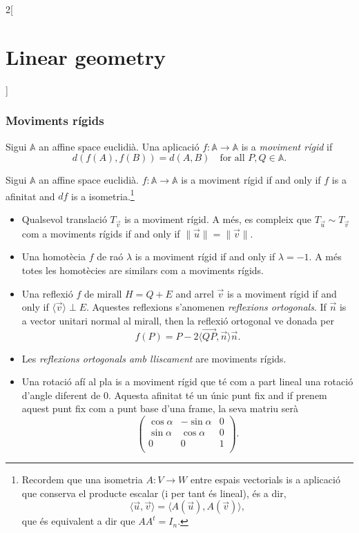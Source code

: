 \documentclass[class=article,10pt,crop=false]{standalone}
\begin{document}
\begin{multicols}{2}[\section{Linear geometry}]
\subsubsection{Moviments rígids}
\begin{definition}
Sigui $\mathbb{A}$ an affine space euclidià. Una aplicació $f:\mathbb{A}\rightarrow\mathbb{A}$ is a \textit{moviment rígid} if $$d(f(A),f(B))=d(A,B)\quad\text{for all } P,Q\in\mathbb{A}.$$
\end{definition}
\begin{prop}
Sigui $\mathbb{A}$ an affine space euclidià. $f:\mathbb{A}\rightarrow\mathbb{A}$ is a moviment rígid if and only if $f$ is a afinitat and $df$ is a isometria.\footnote{Recordem que una isometria $A:V\rightarrow W$ entre espais vectorials is a aplicació que conserva el producte escalar (i per tant és lineal), és a dir, $$\langle\overrightarrow{u},\overrightarrow{v}\rangle=\langle A(\overrightarrow{u}),A(\overrightarrow{v})\rangle,$$ que és equivalent a dir que $AA^t=I_n$.}
\end{prop}
\begin{prop}
\hfill
\begin{itemize}
    \item Qualsevol translació $T_{\overrightarrow{v}}$ is a moviment rígid. A més, es compleix que $T_{\overrightarrow{u}}\sim T_{\overrightarrow{v}}$ com a moviments rígids if and only if $\|\overrightarrow{u}\|=\|\overrightarrow{v}\|.$
    \item Una homotècia $f$ de raó $\lambda$ is a moviment rígid if and only if $\lambda=-1$. A més totes les homotècies are similars com a moviments rígids.
    \item Una reflexió $f$ de mirall $H=Q+E$ and arrel $\overrightarrow{v}$ is a moviment rígid if and only if $\langle\overrightarrow{v}\rangle\perp E$. Aquestes reflexions s'anomenen \textit{reflexions ortogonals}. If $\overrightarrow{n}$ is a vector unitari normal al mirall, then la reflexió ortogonal ve donada per $$f(P)=P-2\langle\overrightarrow{QP},\overrightarrow{n}\rangle\overrightarrow{n}.$$
    \item Les \textit{reflexions ortogonals amb lliscament} are moviments rígids.
    \item Una rotació afí al pla is a moviment rígid que té com a part lineal una rotació d'angle diferent de 0. Aquesta afinitat té un únic punt fix and if prenem aquest punt fix com a punt base d'una frame, la seva matriu serà $$\begin{pmatrix}
    \cos\alpha & -\sin\alpha & 0\\
    \sin\alpha & \cos\alpha & 0\\
    0 & 0 & 1\\
    \end{pmatrix}.$$
\end{itemize}
\end{prop}

\end{multicols}
\end{document}
